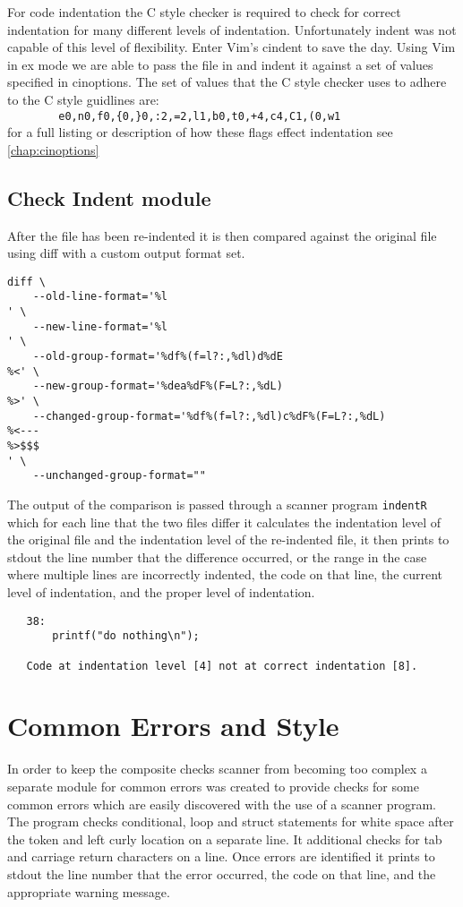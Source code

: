 For code indentation the C style checker is required to check for correct 
indentation for many different levels of indentation. Unfortunately indent was 
not capable of this level of flexibility. Enter Vim's cindent to save the day.
Using Vim in ex mode we are able to pass the file in and indent it against a 
set of values specified in cinoptions. The set of values that the C style 
checker uses to adhere to the C style guidlines are:\\
\verb|        e0,n0,f0,{0,}0,:2,=2,l1,b0,t0,+4,c4,C1,(0,w1| \\
for a full listing or description of how these flags effect indentation see 
\autoref{chap:cinoptions}
\newpage
\subsection{Check Indent module}
After the file has been re-indented it is then compared against the original 
file using diff with a custom output format set.
\begin{verbatim}
diff \
    --old-line-format='%l
' \
    --new-line-format='%l
' \
    --old-group-format='%df%(f=l?:,%dl)d%dE
%<' \
    --new-group-format='%dea%dF%(F=L?:,%dL)
%>' \
    --changed-group-format='%df%(f=l?:,%dl)c%dF%(F=L?:,%dL)
%<---
%>$$$
' \
    --unchanged-group-format=""
\end{verbatim}

\noindent The output of the comparison is passed through a scanner program 
\texttt{indentR} which for each line that the two files differ it calculates 
the indentation level of the original file and the indentation level of the 
re-indented file, it then prints to stdout the line number that the difference 
occurred, or the range in the case where multiple lines are incorrectly 
indented, the code on that line, the current level of 
indentation, and the proper level of indentation.
\begin{verbatim}
   38:
       printf("do nothing\n");

   Code at indentation level [4] not at correct indentation [8].
\end{verbatim}



\section{Common Errors and Style}

In order to keep the composite checks scanner from becoming too complex a 
separate module for common errors was created to provide checks for some common
errors which are easily discovered with the use of a scanner program. The 
program checks conditional, loop and struct statements for white space after 
the token and left curly location on a separate line. It additional checks for 
tab and carriage return characters on a line. Once errors are identified it 
prints to stdout the line number that the error occurred, the code on that 
line, and the appropriate warning message.


